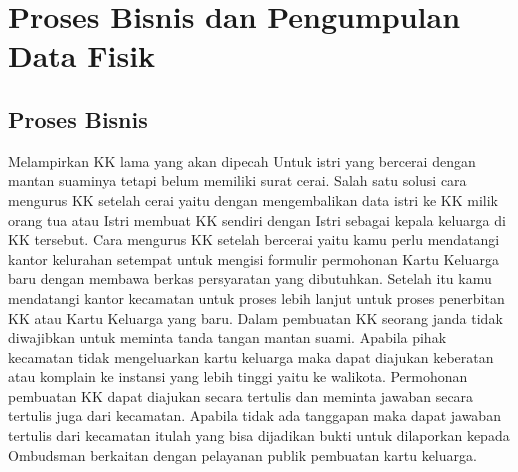 \chapter{Proses Bisnis dan Pengumpulan Data Fisik}

\section{Proses Bisnis}
Melampirkan KK lama yang akan dipecah Untuk istri yang bercerai dengan mantan suaminya tetapi belum memiliki  surat cerai. Salah satu solusi cara mengurus KK setelah cerai yaitu dengan mengembalikan data istri ke KK milik orang tua atau Istri membuat KK sendiri dengan Istri sebagai kepala keluarga di KK tersebut. 
Cara mengurus KK setelah bercerai yaitu kamu perlu mendatangi kantor kelurahan setempat untuk mengisi formulir permohonan Kartu Keluarga baru dengan membawa berkas persyaratan yang dibutuhkan. Setelah itu kamu mendatangi kantor kecamatan untuk proses lebih lanjut untuk proses penerbitan KK atau Kartu Keluarga yang baru.
Dalam pembuatan KK seorang janda tidak diwajibkan untuk meminta tanda tangan mantan suami. Apabila pihak kecamatan tidak mengeluarkan kartu keluarga maka dapat diajukan keberatan atau komplain ke instansi yang lebih tinggi yaitu ke walikota. Permohonan pembuatan KK dapat diajukan secara tertulis dan meminta jawaban secara tertulis juga dari kecamatan. Apabila tidak ada tanggapan maka dapat jawaban tertulis dari kecamatan itulah yang bisa dijadikan bukti untuk dilaporkan kepada Ombudsman berkaitan dengan pelayanan publik pembuatan kartu keluarga.

